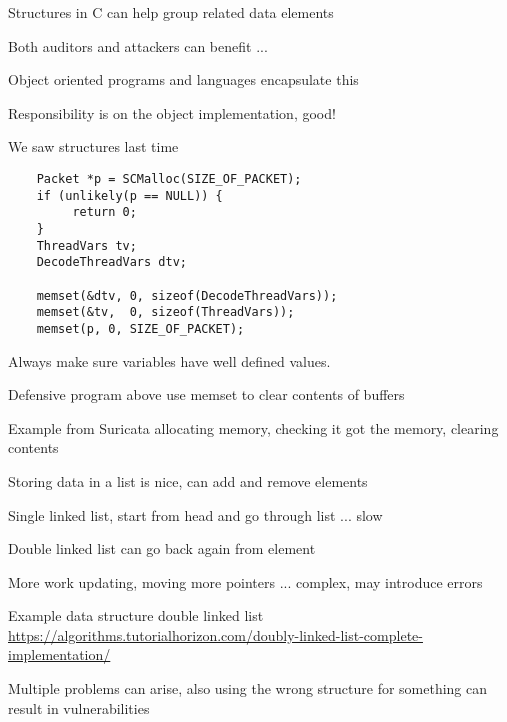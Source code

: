 \documentclass[Screen16to9,17pt]{foils}
\begin{document}


\begin{list2}
\item Structures in C can help group related data elements
\item Both auditors and attackers can benefit ...
\item Object oriented programs and languages encapsulate this
\item Responsibility is on the object implementation, good!
\item We saw structures last time
\end{list2}




\begin{verbatim}
    Packet *p = SCMalloc(SIZE_OF_PACKET);
    if (unlikely(p == NULL)) {
         return 0;
    }
    ThreadVars tv;
    DecodeThreadVars dtv;

    memset(&dtv, 0, sizeof(DecodeThreadVars));
    memset(&tv,  0, sizeof(ThreadVars));
    memset(p, 0, SIZE_OF_PACKET);
\end{verbatim}

\begin{list2}
\item Always make sure variables have well defined values.
\item Defensive program above use memset to clear contents of buffers
\item Example from Suricata allocating memory, checking it got the memory, clearing contents
\end{list2}




\begin{list2}
\item Storing data in a list is nice, can add and remove elements
\item Single linked list, start from head and go through list ... slow
\item Double linked list can go back again from element
\item More work updating, moving more pointers ... complex, may introduce errors
\item Example data structure double linked list\\
\url{https://algorithms.tutorialhorizon.com/doubly-linked-list-complete-implementation/}
\item Multiple problems can arise, also using the wrong structure for something can result in vulnerabilities
\end{list2}
\end{document}

